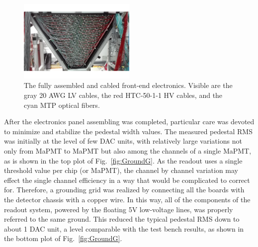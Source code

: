 \documentclass[5p,times,twocolumn]{elsarticle}
\begin{document}
\begin{figure}
\begin{center}
\includegraphics[width=0.50\textwidth]{electronics.pdf}
\caption{The fully assembled and cabled front-end electronics. Visible are the gray 20 AWG LV cables, the red
  HTC-50-1-1 HV cables, and the cyan MTP optical fibers.}
\label{fig:electronics}
\end{center}
\end{figure}

After the electronics panel assembling was completed, particular care was devoted to minimize and stabilize the
pedestal width values. The measured pedestal RMS was initially at the level of few DAC units, with relatively large
variations not only from MaPMT to MaPMT but also among the channels of a single MaPMT, as is shown in the top
plot of Fig.~\ref{fig:GroundG}. As the readout uses a single threshold value per chip (or MaPMT), the channel by
channel variation may effect the single channel efficiency in a way that  would be complicated to correct for.
Therefore, a grounding grid was realized by connecting all the boards with the detector chassis with a copper wire.
In this way, all of the components of the readout system, powered by the floating 5V low-voltage lines, was properly
referred to the same ground. This reduced the typical pedestal RMS down to about 1 DAC unit, a level comparable
with the test bench results, as shown in the bottom plot of Fig.~\ref{fig:GroundG}.
\end{document}
